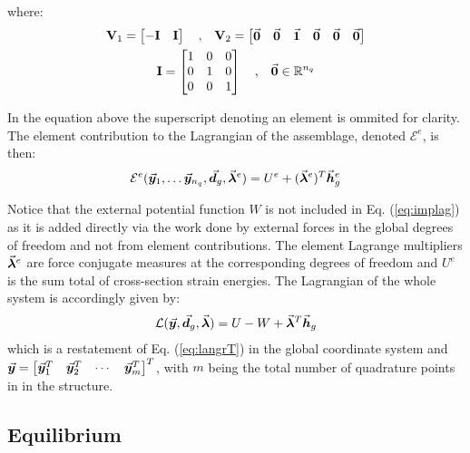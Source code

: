 \noindent where:
\begin{gather}
	\mathbf{V}_1 = \begin{bmatrix}
		-\mathbf{I} & \mathbf{I}
	\end{bmatrix}\quad\text{,}\quad
	\mathbf{V}_2 = \begin{bmatrix}
		\vec{\bm{0}} & \vec{\bm{0}} & \vec{\bm{1}} & \vec{\bm{0}} & \vec{\bm{0}} & \vec{\bm{0}}
	\end{bmatrix}\nonumber\\
	\mathbf{I} = \begin{bmatrix}
		1 & 0 & 0\\
		0 & 1 & 0\\
		0 & 0 & 1
	\end{bmatrix}\quad\text{,}\quad 
	\vec{\bm{0}}\in\mathbb{R}^{n_q}\nonumber
\end{gather}

\noindent In the equation above the superscript denoting an element is ommited
for clarity. The element contribution to the Lagrangian of the assemblage,
denoted $\mathcal{E}^e$, is then:
\begin{gather}
	\mathcal{E}^e(\vec{\bm{y}}_1,\dots \vec{\bm{y}}_{n_q}, 
	\vec{\bm{d}}_g,\vec{\bm{\lambda}}^e) =
	U^e  + (\vec{\bm{\lambda}}^e)^T\vec{\bm{h}}^e_g
	\label{eq:implag}
\end{gather}

\noindent Notice that the external potential function $W$ is not included
in Eq. (\ref{eq:implag}) as it is added directly via the work done by external
forces in the global degrees of freedom and not from element contributions.
The element Lagrange multipliers $\vec{\bm{\lambda}}^e$ are force
conjugate measures at the corresponding degrees of freedom and $U^e$ is the
sum total of cross-section strain energies.
The Lagrangian of the whole system is accordingly given by:
\begin{gather}
	\mathcal{L}(\vec{\bm{y}}, \vec{\bm{d}}_g,\vec{\bm{\lambda}}) =
	U-W+\vec{\bm{\lambda}}^T\vec{\bm{h}}_g
\end{gather}
\noindent which is a restatement of Eq. (\ref{eq:langrT}) in the global 
coordinate
system and $\vec{\bm{y}} = \begin{bmatrix}
	\vec{\bm{y}}_1^T & \vec{\bm{y}}_2^T & \cdots & \vec{\bm{y}}_m^T
\end{bmatrix}^T$, with $m$ being the total number of quadrature points in in
the structure.

\subsection{Equilibrium}\label{subsection:CH2-S4SS1}

